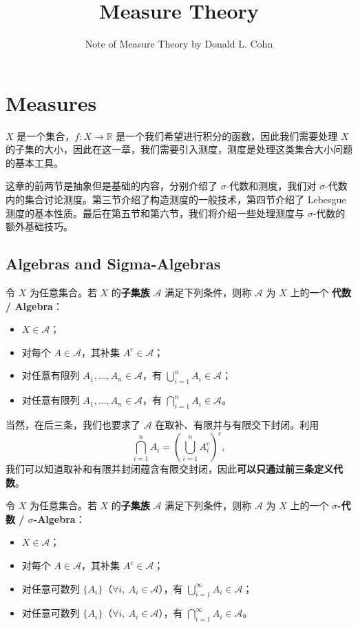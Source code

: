 \documentclass[11pt]{article}
\title{Measure Theory}
\subtitle{Note of Measure Theory by Donald L. Cohn}
\newcommand{\RR}{\mathbb{R}}
\newcommand{\calA}{\mathcal{A}}
\begin{document}
\makecover
\makenotecontents

\section{Measures}

$X$ 是一个集合，$f:X \to \RR$ 是一个我们希望进行积分的函数，因此我们需要处理 $X$ 的子集的大小，因此在这一章，我们需要引入测度，测度是处理这类集合大小问题的基本工具。

这章的前两节是抽象但是基础的内容，分别介绍了 $\sigma$-代数和测度，我们对 $\sigma$-代数内的集合讨论测度。第三节介绍了构造测度的一般技术，第四节介绍了 Lebesgue 测度的基本性质。最后在第五节和第六节，我们将介绍一些处理测度与 $\sigma$-代数的额外基础技巧。

\subsection{Algebras and Sigma-Algebras}

\begin{definition}[Algebra]
    令 $X$ 为任意集合。若 $X$ 的{\normalfont\bfseries 子集族} $\calA$ 满足下列条件，则称 $\calA$ 为 $X$ 上的一个 {\normalfont\bfseries 代数 / Algebra}：
    \begin{itemize}
        \item $X \in \calA$；
        \item 对每个 $A \in \calA$，其补集 $A^c \in \calA$；
        \item 对任意有限列 $A_1,\dots,A_n \in \calA$，有 $\bigcup_{i=1}^n A_i \in \calA$；
        \item 对任意有限列 $A_1,\dots,A_n \in \calA$，有 $\bigcap_{i=1}^n A_i \in \calA$。
    \end{itemize}
\end{definition}

当然，在后三条，我们也要求了 $\calA$ 在取补、有限并与有限交下封闭。利用
\[
    \bigcap_{i=1}^n A_i = \left( \bigcup_{i=1}^n A_i^c \right)^c,
\]
我们可以知道取补和有限并封闭蕴含有限交封闭，因此{\normalfont\bfseries 可以只通过前三条定义代数}。

\begin{definition}
    令 $X$ 为任意集合。若 $X$ 的{\normalfont\bfseries 子集族} $\calA$ 满足下列条件，则称 $\calA$ 为 $X$ 上的一个 {\normalfont\bfseries $\sigma$-代数 / $\sigma$-Algebra}：
    \begin{itemize}
        \item $X \in \calA$；
        \item 对每个 $A \in \calA$，其补集 $A^c \in \calA$；
        \item 对任意可数列 $\{A_i\}$（$\forall i,\ A_i \in \calA$），有 $\bigcup_{i=1}^{\infty} A_i \in \calA$；
        \item 对任意可数列 $\{A_i\}$（$\forall i,\ A_i \in \calA$），有 $\bigcap_{i=1}^{\infty} A_i \in \calA$。
    \end{itemize}
\end{definition}
\end{document}

